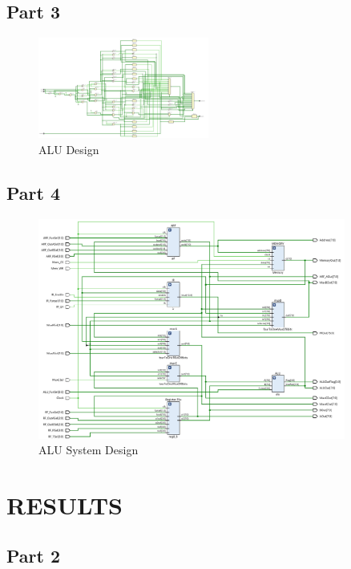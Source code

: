 \documentclass[pdftex,12pt,a4paper]{article}
\begin{document}
\subsection{Part 3}
\begin{figure}[H]
	\centering
	\includegraphics[width=0.5\textwidth]{design/alu.png}	
	\caption{ALU Design}
	\label{ALU Design}
\end{figure}

\subsection{Part 4}
    \begin{figure}[H]
    	\centering
    	\includegraphics[width=0.9\textwidth]{design/ALU_system.png}	
    	\caption{ALU System Design}
    	\label{ALU System Design}
    \end{figure}








\section{RESULTS}
\subsection{Part 2}
\end{document}
